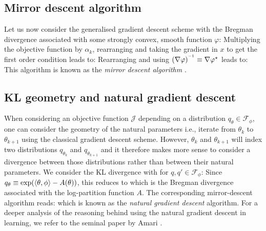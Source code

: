 \subsection{Mirror descent algorithm}
Let us now consider the generalised gradient descent scheme with the Bregman divergence associated with some strongly convex, smooth function $\varphi$:
Multiplying the objective function by $\alpha_{k}$, rearranging and taking the gradient in $x$ to get the first order condition leads to:
Rearranging and using $(\nabla \varphi)^{^{-1}}\equiv \nabla \varphi^{\star}$ leads to:
This algorithm is known as the \emph{mirror descent algorithm} \citep{beck03}. 

\subsection{KL geometry and natural gradient descent}
When considering an objective function $\mathcal J$ depending on a distribution $q_{\theta}\in\mathcal F_{\phi}$, one can consider the geometry of the natural parameters i.e., iterate from $\theta_{k}$ to $\theta_{k+1}$ using the classical gradient descent scheme. However, $\theta_{k}$ and $\theta_{k+1}$ will index two distributions $q_{\theta_{k}}$ and $q_{\theta_{k+1}}$ and it therefore makes more sense to consider a divergence between those distributions rather than between their natural parameters. 
We consider the KL divergence with for $q,q'\in\mathcal F_{\phi}$:
Since $q_{\theta}\equiv\exp(\left\langle \theta,\phi \right\rangle-A(\theta))$, this reduces to
which is the Bregman divergence associated with the log-partition function $A$. The corresponding mirror-descent algorithm reads:
which is known as the \emph{natural gradient descent} algorithm. For a deeper analysis of the reasoning behind using the natural gradient descent in learning, we refer to the seminal paper by Amari \citep{amari98}.